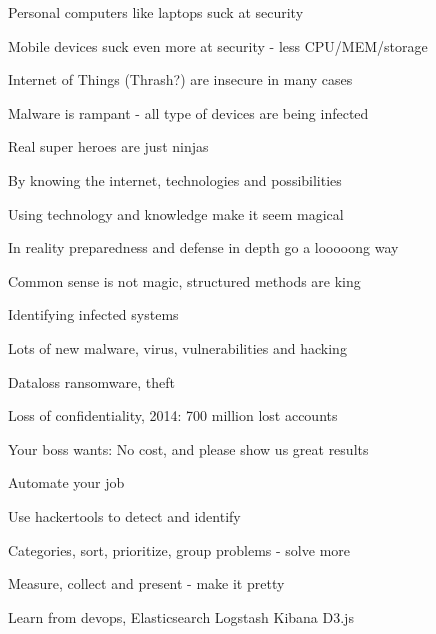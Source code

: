 \documentclass[20pt,landscape,a4paper,footrule]{foils}
\begin{document}

\begin{list1}
\item Personal computers like laptops suck at security
\item Mobile devices suck even more at security - less CPU/MEM/storage
\item Internet of Things (Thrash?) are insecure in many cases
\item Malware is rampant - all type of devices are being infected
\end{list1}



\begin{list1}
\item Real super heroes are just ninjas
\item By knowing the internet, technologies and possibilities
\item Using technology and knowledge make it seem magical
\item In reality preparedness and defense in depth go a looooong way
\item Common sense is not magic, structured methods are king
\end{list1}


\begin{list1}
\item Identifying infected systems
\item Lots of new malware, virus, vulnerabilities and hacking
\item Dataloss ransomware, theft
\item Loss of confidentiality, 2014: 700 million lost accounts
\end{list1}

\vskip 2cm
\centerline{Your boss wants: No cost, and please show us great results}


\begin{list1}
\item Automate your job
\item Use hackertools to detect and identify
\item Categories, sort, prioritize, group problems - solve more
\item Measure, collect and present - make it pretty
\item Learn from devops, Elasticsearch Logstash Kibana D3.js
\end{list1}
\end{document}
